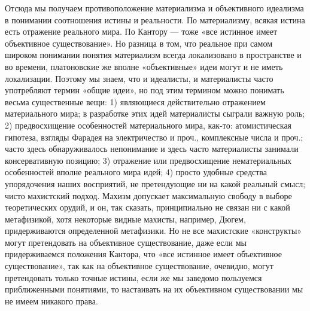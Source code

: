 Отсюда мы получаем противоположение материализма и объективного
идеализма в понимании соотношения истины и реальности. По
материализму, всякая истина есть отражение реального мира. По Кантору
--- тоже «все истинное имеет объективное существование». Но разница в
том, что реальное при самом широком понимании понятия материализм
всегда локализовано в пространстве и во времени, платоновские же
вполне «объективные» идеи могут и не иметь локализации. Поэтому мы
знаем, что и идеалисты, и материалисты часто употребляют термин «общие
идеи», но под этим термином можно понимать весьма существенные вещи:
1) являющиеся действительно отражением материального мира; в
разработке этих идей материалисты сыграли важную роль; 2)
предвосхищение особенностей материального мира, как-то: атомистическая
гипотеза, взгляды Фарадея на электричество и проч., комплексные числа
и проч.; часто здесь обнаруживалось непонимание и здесь часто
материалисты занимали консервативную позицию; 3) отражение или
предвосхищение нематериальных особенностей вполне реального мира идей;
4) просто удобные средства упорядочения наших восприятий, не
претендующие ни на какой реальный смысл; чисто махистский подход.
Махизм допускает максимальную свободу в выборе теоретических орудий, и
он, так сказать, принципиально не связан ни с какой метафизикой, хотя
некоторые видные махисты, например, Дюгем, придерживаются определенной
метафизики. Но не все махистские «конструкты» могут претендовать на
объективное существование, даже если мы придерживаемся положения
Кантора, что «все истинное имеет объективное существование», так как
на объективное существование, очевидно, могут претендовать только
точные истины, если же мы заведомо пользуемся приближенными понятиями,
то настаивать на их объективном существовании мы не имеем никакого
права.

